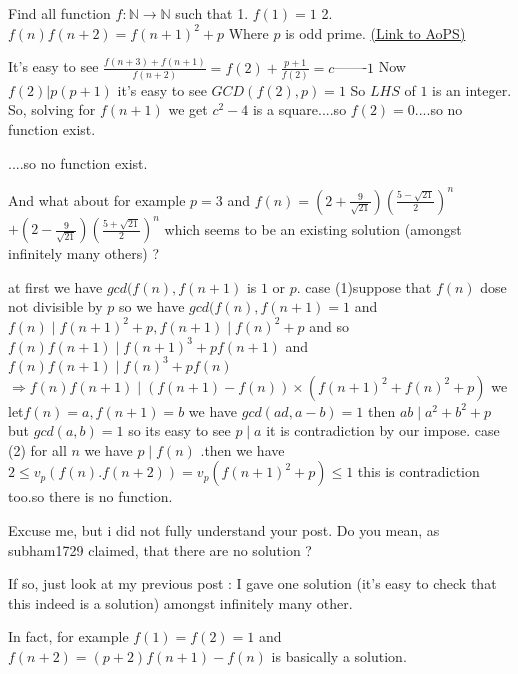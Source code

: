 \begin{problem}
	Find all function $f:\mathbb{N} \to \mathbb{N}$ such that 
1. $f(1)=1$
2. $f(n)f(n+2)=f(n+1)^2+p$
Where $p$ is odd prime.
	\flushright \href{https://artofproblemsolving.com/community/c6h489590}{(Link to AoPS)}
\end{problem}



\begin{solution}
	It's easy to see $\frac {f(n+3)+f(n+1)}{f(n+2)}=f(2)+\frac {p+1}{f(2)}=c$-------$1$
Now $f(2)|p(p+1)$ it's easy to see $GCD (f(2),p)=1$
So $LHS$ of $1$ is an integer.
So, solving for $f(n+1)$ we get $c^2-4$ is a square....so $f(2)=0$....so no function exist.
\end{solution}



\begin{solution}
	\begin{tcolorbox}....so no function exist.\end{tcolorbox}
And what about for example $p=3$ and $f(n)=\left(2+\frac 9{\sqrt{21}}\right)\left(\frac{5-\sqrt{21}}2\right)^n$ $+\left(2-\frac 9{\sqrt{21}}\right)\left(\frac{5+\sqrt{21}}2\right)^n$ which seems to be an existing solution (amongst infinitely many others) ?
\end{solution}



\begin{solution}
	at first we have $gcd(f(n),f(n+1)$ is $1$ or $p$.
case (1)suppose that $f(n)$ dose not divisible by $p$ so we have $gcd(f(n),f(n+1)=1$ and $f(n)\mid f(n+1)^2+p,f(n+1)\mid f(n)^2+p$ and so $f(n)f(n+1)\mid f(n+1)^{3}+pf(n+1)$ and $f(n)f(n+1)\mid f(n)^{3}+pf(n)$ $\Rightarrow f(n)f(n+1)\mid (f(n+1)-f(n))\times (f(n+1)^2+f(n)^2+p)$ we let$ f(n)=a,f(n+1)=b$ we have $gcd(ad,a-b)=1$ then $ab\mid a^2+b^2+p$ but $gcd(a,b)=1$ so its easy to see $p\mid a$ it is contradiction by our impose.
case (2) for all $n$ we have  $p\mid f(n)$ .then we have $2\leq v_{p}(f(n).f(n+2))=v_{p}(f(n+1)^2+p)\leq 1$ this is  contradiction too.so there is no function.
\end{solution}



\begin{solution}
	Excuse me, but i did not fully understand your post.  Do you mean, as subham1729 claimed, that there are no solution ?

If so, just look at my previous post : I gave one solution (it's easy to check that this indeed is a solution) amongst infinitely many other.

In fact, for example $f(1)=f(2)=1$ and $f(n+2)=(p+2)f(n+1)-f(n)$ is basically a solution.
\end{solution}




